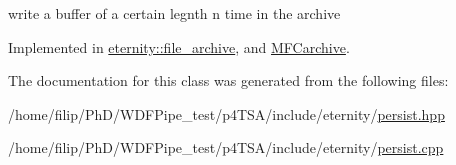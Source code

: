write a buffer of a certain legnth n time in the archive 



Implemented in \hyperlink{classeternity_1_1file__archive_a0eaf4b5937b3ff46df3627f64efc19e8}{eternity\+::file\+\_\+archive}, and \hyperlink{class_m_f_carchive_a8c5191701a84b9a4d2812887cfc28651}{M\+F\+Carchive}.



The documentation for this class was generated from the following files\+:\begin{DoxyCompactItemize}
\item 
/home/filip/\+Ph\+D/\+W\+D\+F\+Pipe\+\_\+test/p4\+T\+S\+A/include/eternity/\hyperlink{persist_8hpp}{persist.\+hpp}\item 
/home/filip/\+Ph\+D/\+W\+D\+F\+Pipe\+\_\+test/p4\+T\+S\+A/include/eternity/\hyperlink{persist_8cpp}{persist.\+cpp}\end{DoxyCompactItemize}
